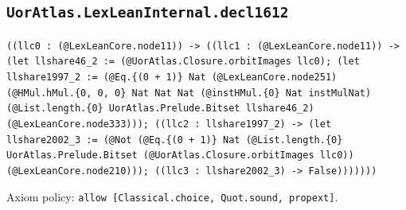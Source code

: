 \documentclass[11pt]{article}
\begin{document}
\subsection*{\texttt{UorAtlas.LexLeanInternal.decl1612}}
\noindent\texttt{((llc0 : (@LexLeanCore.node11)) -> ((llc1 : (@LexLeanCore.node11)) -> (let llshare46\_2 := (@UorAtlas.Closure.orbitImages llc0); (let llshare1997\_2 := (@Eq.\{(0 + 1)\} Nat (@LexLeanCore.node251) (@HMul.hMul.\{0, 0, 0\} Nat Nat Nat (@instHMul.\{0\} Nat instMulNat) (@List.length.\{0\} UorAtlas.Prelude.Bitset llshare46\_2) (@LexLeanCore.node333))); ((llc2 : llshare1997\_2) -> (let llshare2002\_3 := (@Not (@Eq.\{(0 + 1)\} Nat (@List.length.\{0\} UorAtlas.Prelude.Bitset (@UorAtlas.Closure.orbitImages llc0)) (@LexLeanCore.node210))); ((llc3 : llshare2002\_3) -> False)))))))}\par
\noindent Axiom policy: \texttt{allow [Classical.choice, Quot.sound, propext]}.\par
\end{document}
